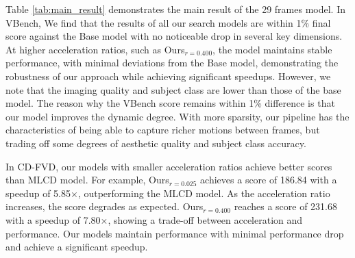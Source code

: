Table \ref{tab:main_result} demonstrates the main result of the 29 frames model. In VBench, We find that the results of all our search models are within 1\% final score against the Base model with no noticeable drop in several key dimensions. %
At higher acceleration ratios, such as Ours$_{r=0.400}$, the model maintains stable performance, with minimal deviations from the Base model, demonstrating the robustness of our approach while achieving significant speedups. However, we note that the imaging quality and subject class are lower than those of the base model. The reason why the VBench score remains within 1\% difference is that our model improves the dynamic degree. With more sparsity, our pipeline has the characteristics of being able to capture richer motions between frames, but trading off some degrees of aesthetic quality and subject class accuracy.

In CD-FVD, our models with smaller acceleration ratios achieve better scores than MLCD model. For example, Ours$_{r=0.025}$ achieves a score of 186.84 with a speedup of 5.85$\times$, outperforming the MLCD model. As the acceleration ratio increases, the score degrades as expected. Ours$_{r=0.400}$ reaches a score of 231.68 with a speedup of 7.80$\times$, showing a trade-off between acceleration and performance.
Our models maintain performance with minimal performance drop and achieve a significant speedup. %

